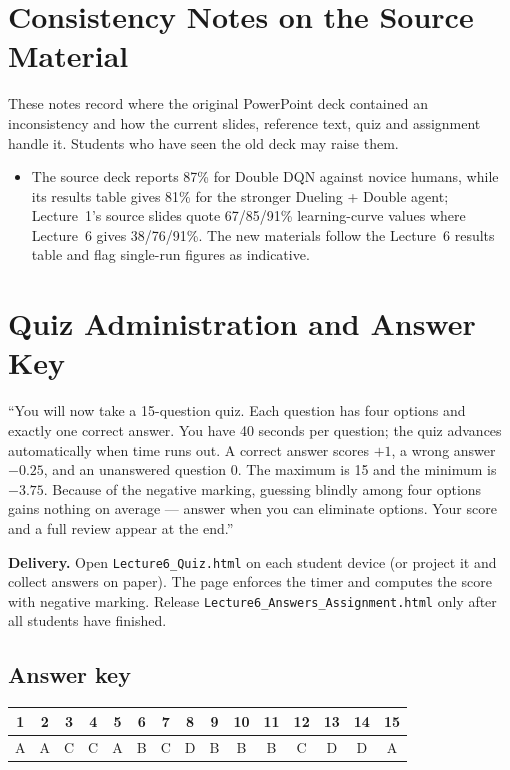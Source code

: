 \documentclass[11pt]{article}
\begin{document}
\section{Consistency Notes on the Source Material}These notes record where the original PowerPoint deck contained an inconsistency and how the current slides, reference text, quiz and assignment handle it. Students who have seen the old deck may raise them.\begin{itemize}\item The source deck reports 87\% for Double DQN against novice humans, while its results table gives 81\% for the stronger Dueling + Double agent; Lecture~1's source slides quote 67/85/91\% learning-curve values where Lecture~6 gives 38/76/91\%. The new materials follow the Lecture~6 results table and flag single-run figures as indicative.\end{itemize}

\section{Quiz Administration and Answer Key}

\begin{sayit}``You will now take a 15-question quiz. Each question has four options and exactly one correct answer. You have 40 seconds per question; the quiz advances automatically when time runs out. A correct answer scores $+1$, a wrong answer $-0.25$, and an unanswered question 0. The maximum is 15 and the minimum is $-3.75$. Because of the negative marking, guessing blindly among four options gains nothing on average --- answer when you can eliminate options. Your score and a full review appear at the end.''\end{sayit}

\textbf{Delivery.} Open \texttt{Lecture6\_Quiz.html} on each student device (or project it and collect answers on paper). The page enforces the timer and computes the score with negative marking. Release \texttt{Lecture6\_Answers\_Assignment.html} only after all students have finished.

\subsection*{Answer key}\begin{center}\small\renewcommand{\arraystretch}{1.3}\begin{tabular}{|c|c|c|c|c|c|c|c|c|c|c|c|c|c|c|}\hline \textbf{1} & \textbf{2} & \textbf{3} & \textbf{4} & \textbf{5} & \textbf{6} & \textbf{7} & \textbf{8} & \textbf{9} & \textbf{10} & \textbf{11} & \textbf{12} & \textbf{13} & \textbf{14} & \textbf{15}\\\hline A & A & C & C & A & B & C & D & B & B & B & C & D & D & A\\\hline\end{tabular}\end{center}
\end{document}
